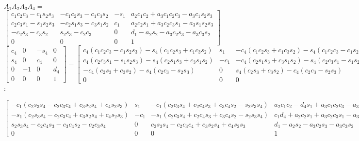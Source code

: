 \documentclass{article}
\begin{document}
$A_{1}A_{2}A_{3}A_{4}=\ $ $\left[ 
\begin{array}{cccc}
c_{1}c_{2}c_{3}-c_{1}s_{2}s_{3} & -c_{1}c_{2}s_{3}-c_{1}c_{3}s_{2} & -s_{1}
& a_{2}c_{1}c_{2}+a_{3}c_{1}c_{2}c_{3}-a_{3}c_{1}s_{2}s_{3} \\ 
c_{2}c_{3}s_{1}-s_{1}s_{2}s_{3} & -c_{2}s_{1}s_{3}-c_{3}s_{1}s_{2} & c_{1} & 
a_{2}c_{2}s_{1}+a_{3}c_{2}c_{3}s_{1}-a_{3}s_{1}s_{2}s_{3} \\ 
-c_{2}s_{3}-c_{3}s_{2} & s_{2}s_{3}-c_{2}c_{3} & 0 & 
d_{1}-a_{2}s_{2}-a_{3}c_{2}s_{3}-a_{3}c_{3}s_{2} \\ 
0 & 0 & 0 & 1%
\end{array}%
\right] \allowbreak $ $\left[ 
\begin{array}{cccc}
c_{4} & 0 & -s_{4} & 0 \\ 
s_{4} & 0 & c_{4} & 0 \\ 
0 & -1 & 0 & d_{4} \\ 
0 & 0 & 0 & 1%
\end{array}%
\right] =\allowbreak \left[ 
\begin{array}{cccc}
c_{4}\left( c_{1}c_{2}c_{3}-c_{1}s_{2}s_{3}\right) -s_{4}\left(
c_{1}c_{2}s_{3}+c_{1}c_{3}s_{2}\right)  & s_{1} & -c_{4}\left(
c_{1}c_{2}s_{3}+c_{1}c_{3}s_{2}\right) -s_{4}\left(
c_{1}c_{2}c_{3}-c_{1}s_{2}s_{3}\right)  & 
a_{2}c_{1}c_{2}-d_{4}s_{1}+a_{3}c_{1}c_{2}c_{3}-a_{3}c_{1}s_{2}s_{3} \\ 
c_{4}\left( c_{2}c_{3}s_{1}-s_{1}s_{2}s_{3}\right) -s_{4}\left(
c_{2}s_{1}s_{3}+c_{3}s_{1}s_{2}\right)  & -c_{1} & -c_{4}\left(
c_{2}s_{1}s_{3}+c_{3}s_{1}s_{2}\right) -s_{4}\left(
c_{2}c_{3}s_{1}-s_{1}s_{2}s_{3}\right)  & 
c_{1}d_{4}+a_{2}c_{2}s_{1}+a_{3}c_{2}c_{3}s_{1}-a_{3}s_{1}s_{2}s_{3} \\ 
-c_{4}\left( c_{2}s_{3}+c_{3}s_{2}\right) -s_{4}\left(
c_{2}c_{3}-s_{2}s_{3}\right)  & 0 & s_{4}\left( c_{2}s_{3}+c_{3}s_{2}\right)
-c_{4}\left( c_{2}c_{3}-s_{2}s_{3}\right)  & 
d_{1}-a_{2}s_{2}-a_{3}c_{2}s_{3}-a_{3}c_{3}s_{2} \\ 
0 & 0 & 0 & 1%
\end{array}%
\right] \allowbreak $ :

$\left[ 
\begin{array}{cccc}
-c_{1}\left(
c_{2}s_{3}s_{4}-c_{2}c_{3}c_{4}+c_{3}s_{2}s_{4}+c_{4}s_{2}s_{3}\right)  & 
s_{1} & -c_{1}\left(
c_{2}c_{3}s_{4}+c_{2}c_{4}s_{3}+c_{3}c_{4}s_{2}-s_{2}s_{3}s_{4}\right)  & 
a_{2}c_{1}c_{2}-d_{4}s_{1}+a_{3}c_{1}c_{2}c_{3}-a_{3}c_{1}s_{2}s_{3} \\ 
-s_{1}\left(
c_{2}s_{3}s_{4}-c_{2}c_{3}c_{4}+c_{3}s_{2}s_{4}+c_{4}s_{2}s_{3}\right)  & 
-c_{1} & -s_{1}\left(
c_{2}c_{3}s_{4}+c_{2}c_{4}s_{3}+c_{3}c_{4}s_{2}-s_{2}s_{3}s_{4}\right)  & 
c_{1}d_{4}+a_{2}c_{2}s_{1}+a_{3}c_{2}c_{3}s_{1}-a_{3}s_{1}s_{2}s_{3} \\ 
s_{2}s_{3}s_{4}-c_{2}c_{4}s_{3}-c_{3}c_{4}s_{2}-c_{2}c_{3}s_{4} & 0 & 
c_{2}s_{3}s_{4}-c_{2}c_{3}c_{4}+c_{3}s_{2}s_{4}+c_{4}s_{2}s_{3} & 
d_{1}-a_{2}s_{2}-a_{3}c_{2}s_{3}-a_{3}c_{3}s_{2} \\ 
0 & 0 & 0 & 1%
\end{array}%
\right] \allowbreak $
\end{document}

